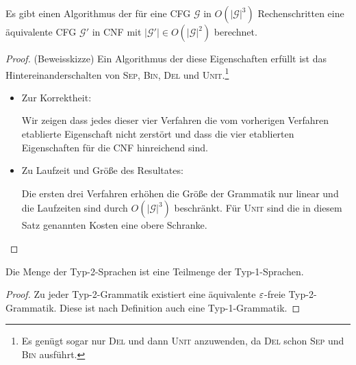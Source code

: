 \begin{Satz}\label{satz:CFGtoCNF}
Es gibt einen Algorithmus der für eine \ac{CFG} $\mathcal{G}$ in $O(|\mathcal{G}|^3)$ Rechenschritten eine äquivalente \ac{CFG} $\mathcal{G}'$ in CNF mit $|\mathcal{G}'|\in O(|\mathcal{G}|^2)$ berechnet.
\end{Satz}

\begin{proof} (Beweisskizze)
	Ein Algorithmus der diese Eigenschaften erfüllt ist das Hintereinanderschalten von \textsc{Sep}, \textsc{Bin}, \textsc{Del} und \textsc{Unit}.\footnote{Es genügt sogar nur \textsc{Del} und dann \textsc{Unit} anzuwenden, da \textsc{Del} schon \textsc{Sep} und \textsc{Bin} ausführt.}
		\begin{itemize}
	\item Zur Korrektheit:
	
	Wir zeigen dass jedes dieser vier Verfahren die vom vorherigen Verfahren etablierte Eigenschaft nicht zerstört und dass die vier etablierten Eigenschaften für die \ac{CNF} hinreichend sind.
	
	\item Zu Laufzeit und Größe des Resultates:
	
	Die ersten drei Verfahren erhöhen die Größe der Grammatik nur linear und die Laufzeiten sind durch $O(|\mathcal{G}|^3)$ beschränkt. 
	Für \textsc{Unit} sind die in diesem Satz genannten Kosten eine obere Schranke. 
	\qedhere
	\end{itemize}
\end{proof}
	

\begin{lemma}
 Die Menge der Typ-2-Sprachen ist eine Teilmenge der Typ-1-Sprachen.
\end{lemma}
\begin{proof}
 Zu jeder Typ-2-Grammatik existiert eine äquivalente $\varepsilon$-freie Typ-2-Grammatik.
 Diese ist nach Definition auch eine Typ-1-Grammatik.
\end{proof}






